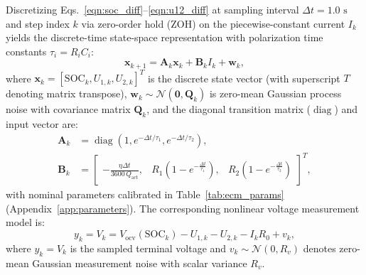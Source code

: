 \documentclass[11pt,a4paper]{article}
\begin{document}
Discretizing Eqs.~\eqref{eqn:soc_diff}--\eqref{eqn:u12_diff} at sampling interval $\Delta t = 1.0\text{ s}$ and step index $k$ via zero-order hold (ZOH) on the piecewise-constant current $I_k$ yields the discrete-time state-space representation with polarization time constants $\tau_i = R_i C_i$:
\begin{equation}\label{eqn:state_space_discrete}
\mathbf{x}_{k+1} = \mathbf{A}_k \mathbf{x}_k + \mathbf{B}_k I_k + \mathbf{w}_k,
\end{equation}
where $\mathbf{x}_k = [\text{SOC}_k, U_{1,k}, U_{2,k}]^T$ is the discrete state vector (with superscript $T$ denoting matrix transpose), $\mathbf{w}_k \sim \mathcal{N}(\mathbf{0}, \mathbf{Q}_k)$ is zero-mean Gaussian process noise with covariance matrix $\mathbf{Q}_k$, and the diagonal transition matrix ($\operatorname{diag}$) and input vector are:
\begin{align}
\mathbf{A}_k &= \operatorname{diag}\left(1, e^{-\Delta t/\tau_1}, e^{-\Delta t/\tau_2}\right), \label{eqn:Ak_mat} \\
\mathbf{B}_k &= \begin{bmatrix}
-\frac{\eta \Delta t}{3600\,Q_{\text{act}}}, & R_1\left(1 - e^{-\frac{\Delta t}{\tau_1}}\right), & R_2\left(1 - e^{-\frac{\Delta t}{\tau_2}}\right)
\end{bmatrix}^T, \label{eqn:Bk_mat}
\end{align}
with nominal parameters calibrated in Table~\ref{tab:ecm_params} (Appendix~\ref{app:parameters}). The corresponding nonlinear voltage measurement model is:
\begin{equation}\label{eqn:measurement_eq}
y_k = V_k = V_{\text{ocv}}(\text{SOC}_k) - U_{1,k} - U_{2,k} - I_k R_0 + v_k,
\end{equation}
where $y_k = V_k$ is the sampled terminal voltage and $v_k \sim \mathcal{N}(0, R_v)$ denotes zero-mean Gaussian measurement noise with scalar variance $R_v$.
\end{document}
